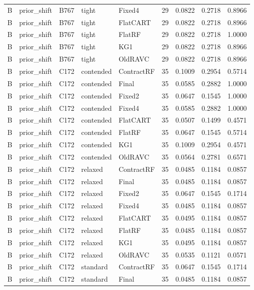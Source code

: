 \begin{longtable}{@{}lllllllll@{}}
B & prior\_shift & B767 & tight & Fixed4 & 29 & 0.0822 & 0.2718 & 0.8966\\
B & prior\_shift & B767 & tight & FlatCART & 29 & 0.0822 & 0.2718 & 0.8966\\
B & prior\_shift & B767 & tight & FlatRF & 29 & 0.0822 & 0.2718 & 1.0000\\
B & prior\_shift & B767 & tight & KG1 & 29 & 0.0822 & 0.2718 & 0.8966\\
B & prior\_shift & B767 & tight & OldRAVC & 29 & 0.0822 & 0.2718 & 0.8966\\
B & prior\_shift & C172 & contended & ContractRF & 35 & 0.1009 & 0.2954 & 0.5714\\
B & prior\_shift & C172 & contended & Final & 35 & 0.0585 & 0.2882 & 1.0000\\
B & prior\_shift & C172 & contended & Fixed2 & 35 & 0.0647 & 0.1545 & 1.0000\\
B & prior\_shift & C172 & contended & Fixed4 & 35 & 0.0585 & 0.2882 & 1.0000\\
B & prior\_shift & C172 & contended & FlatCART & 35 & 0.0507 & 0.1499 & 0.4571\\
B & prior\_shift & C172 & contended & FlatRF & 35 & 0.0647 & 0.1545 & 0.5714\\
B & prior\_shift & C172 & contended & KG1 & 35 & 0.1009 & 0.2954 & 0.4571\\
B & prior\_shift & C172 & contended & OldRAVC & 35 & 0.0564 & 0.2781 & 0.6571\\
B & prior\_shift & C172 & relaxed & ContractRF & 35 & 0.0485 & 0.1184 & 0.0857\\
B & prior\_shift & C172 & relaxed & Final & 35 & 0.0485 & 0.1184 & 0.0857\\
B & prior\_shift & C172 & relaxed & Fixed2 & 35 & 0.0647 & 0.1545 & 0.1714\\
B & prior\_shift & C172 & relaxed & Fixed4 & 35 & 0.0485 & 0.1184 & 0.0857\\
B & prior\_shift & C172 & relaxed & FlatCART & 35 & 0.0495 & 0.1184 & 0.0857\\
B & prior\_shift & C172 & relaxed & FlatRF & 35 & 0.0485 & 0.1184 & 0.0857\\
B & prior\_shift & C172 & relaxed & KG1 & 35 & 0.0495 & 0.1184 & 0.0857\\
B & prior\_shift & C172 & relaxed & OldRAVC & 35 & 0.0535 & 0.1121 & 0.0571\\
B & prior\_shift & C172 & standard & ContractRF & 35 & 0.0647 & 0.1545 & 0.1714\\
B & prior\_shift & C172 & standard & Final & 35 & 0.0485 & 0.1184 & 0.0857\\

\end{longtable}
